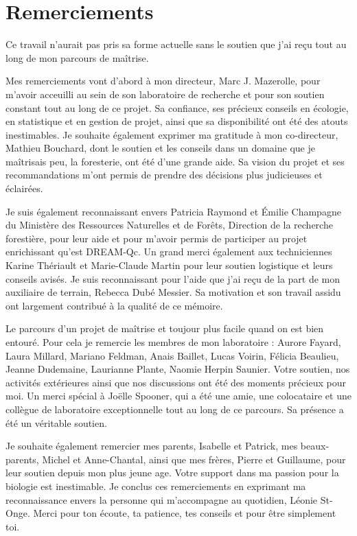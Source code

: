 \chapter*{Remerciements}        %
\label{chap-remerciements}      %


 Ce travail n'aurait pas pris sa forme actuelle sans le soutien que j'ai reçu tout au long de mon parcours de maîtrise.

 Mes remerciements vont d'abord à mon directeur, Marc J. Mazerolle, pour m'avoir acceuilli au sein de son laboratoire de recherche et pour son soutien constant tout au long de ce projet. 
 Sa confiance, ses précieux conseils en écologie, en statistique et en gestion de projet, ainsi que sa disponibilité ont été des atouts inestimables.
 Je souhaite également exprimer ma gratitude à mon co-directeur, Mathieu Bouchard, dont le soutien et les conseils dans un domaine que je maîtrisais peu, la foresterie, ont été d'une grande aide. 
 Sa vision du projet et ses recommandations m'ont permis de prendre des décisions plus judicieuses et éclairées.

 Je suis également reconnaissant envers Patricia Raymond et Émilie Champagne du Ministère des Ressources Naturelles et de Forêts, Direction de la recherche forestière, pour leur aide et 
 pour m'avoir permis de participer au projet enrichissant qu'est DREAM-Qc.
 Un grand merci également aux techniciennes Karine Thériault et Marie-Claude Martin pour leur soutien logistique et leurs conseils avisés.
 Je suis reconnaissant pour l'aide que j'ai reçu de la part de mon auxiliaire de terrain, Rebecca Dubé Messier. Sa motivation et son travail assidu ont largement contribué à la qualité de ce mémoire.

 Le parcours d'un projet de maîtrise et toujour plus facile quand on est bien entouré. 
 Pour cela je remercie les membres de mon laboratoire : 
 Aurore Fayard, Laura Millard, Mariano Feldman, Anais Baillet, Lucas Voirin, Félicia Beaulieu, Jeanne Dudemaine, Laurianne Plante, Naomie Herpin Saunier. 
 Votre soutien, nos activités extérieures ainsi que nos discussions ont été des moments précieux pour moi.
 Un merci spécial à Joëlle Spooner, qui a été une amie, une colocataire et une collègue de laboratoire exceptionnelle tout au long de ce parcours. 
 Sa présence a été un véritable soutien.

 Je souhaite également remercier mes parents, Isabelle et Patrick, mes beaux-parents, Michel et Anne-Chantal, ainsi que mes frères, Pierre et Guillaume, pour leur soutien depuis 
 mon plus jeune age. Votre support dans ma passion pour la biologie est inestimable.
 Je conclus ces remerciements en exprimant ma reconnaissance envers la personne qui m'accompagne au quotidien, Léonie St-Onge. 
 Merci pour ton écoute, ta patience, tes conseils et pour être simplement toi.

